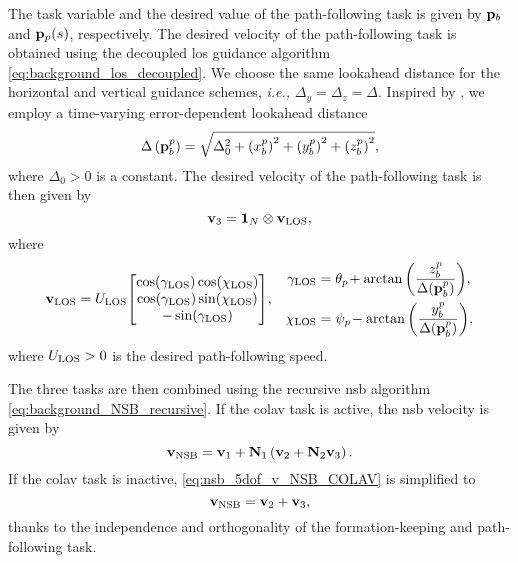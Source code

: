 The task variable and the desired value of the path-following task is given by $\mathbf{p}_b$ and $\mathbf{p}_p(s)$, respectively.
The desired velocity of the path-following task is obtained using the decoupled \gls{los} guidance algorithm \eqref{eq:background_los_decoupled}.
We choose the same lookahead distance for the horizontal and vertical guidance schemes, \emph{i.e.,} $\Delta_y = \Delta_z = \Delta$.
Inspired by \cite{belleter_2019_observer}, we employ a time-varying error-dependent lookahead distance
\begin{equation}
    \Delta\left(\mathbf{p}_b^p\right) = \sqrt{\Delta_0^2 + \left(x_b^p\right)^2 + \left(y_b^p\right)^2 + \left(z_b^p\right)^2}, \label{eq:nsb_5dof_delta}
\end{equation}
where $\Delta_0 > 0$ is a constant.
The desired velocity of the path-following task is then given by
\begin{equation}
    \mathbf{v}_{ 3} = \mathbf{1}_N \otimes \mathbf{v}_{\rm LOS},
\end{equation}
where
\begin{align}
    \mathbf{v}_{\rm LOS} &= U_{\rm LOS} \!
    \begin{bmatrix}
        \cos(\gamma_{\rm LOS}) \cos(\chi_{\rm LOS}) \\
        \cos(\gamma_{\rm LOS}) \sin(\chi_{\rm LOS}) \\
        -\sin(\gamma_{\rm LOS})
    \end{bmatrix}\!, &
    \begin{split}
        \gamma_{\rm LOS} &= \theta_{p\!} + \arctan\left(\frac{z_b^p}{\Delta(\mathbf{p}_b^p)}\right)\!, \\
        \chi_{\rm LOS} &= \psi_{p\!} - \arctan\left(\frac{y_b^p}{\Delta(\mathbf{p}_b^p)}\right)\!, \\
    \end{split}
    \label{eq:nsb_5dof_v_LOS}
\end{align}
where $U_{\rm LOS} > 0$ is the desired path-following speed.

The three tasks are then combined using the recursive \gls{nsb} algorithm \eqref{eq:background_NSB_recursive}.
If the \gls{colav} task is active, the \gls{nsb} velocity is given by
\begin{equation}
    \mathbf{v}_{\rm NSB} = \mathbf{v}_{ 1} + \mathbf{N}_1 \left(\mathbf{v}_{ 2} + \mathbf{N}_2 \mathbf{v}_{ 3}\right).
    \label{eq:nsb_5dof_v_NSB_COLAV}
\end{equation}
If the \gls{colav} task is inactive, \eqref{eq:nsb_5dof_v_NSB_COLAV} is simplified to
\begin{equation}
    \mathbf{v}_{\rm NSB} = \mathbf{v}_{ 2} + \mathbf{v}_{ 3},
\end{equation}
thanks to the independence and orthogonality of the formation-keeping and path-following task.

